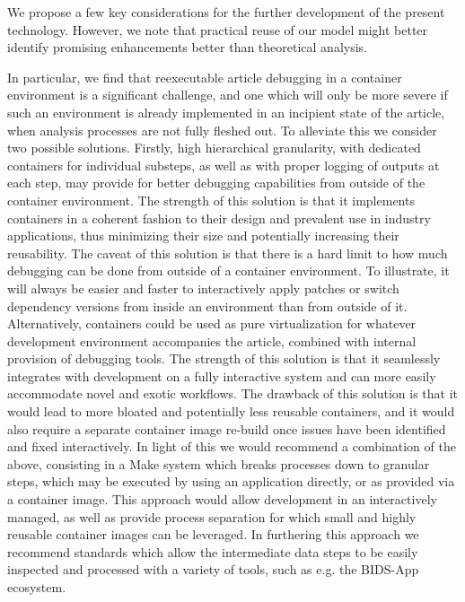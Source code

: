 We propose a few key considerations for the further development of the present technology.
However, we note that practical reuse of our model might better identify promising enhancements better than theoretical analysis.

In particular, we find that reexecutable article debugging in a container environment is a significant challenge, and one which will only be more severe if such an environment is already implemented in an incipient state of the article, when analysis processes are not fully fleshed out.
To alleviate this we consider two possible solutions.
Firstly, high hierarchical granularity, with dedicated containers for individual substeps, as well as with proper logging of outputs at each step, may provide for better debugging capabilities from outside of the container environment.
The strength of this solution is that it implements containers in a coherent fashion to their design and prevalent use in industry applications, thus minimizing their size and potentially increasing their reusability.
The caveat of this solution is that there is a hard limit to how much debugging can be done from outside of a container environment.
To illustrate, it will always be easier and faster to interactively apply patches or switch dependency versions from inside an environment than from outside of it.
Alternatively, containers could be used as pure virtualization for whatever development environment accompanies the article, combined with internal provision of debugging tools.
The strength of this solution is that it seamlessly integrates with development on a fully interactive system and can more easily accommodate novel and exotic workflows.
The drawback of this solution is that it would lead to more bloated and potentially less reusable containers, and it would also require a separate container image re-build once issues have been identified and fixed interactively.
In light of this we would recommend a combination of the above, consisting in a Make system which breaks processes down to granular steps, which may be executed by using an application directly, or as provided via a container image.
This approach would allow development in an interactively managed, as well as provide process separation for which small and highly reusable container images can be leveraged.
In furthering this approach we recommend standards which allow the intermediate data steps to be easily inspected and processed with a variety of tools, such as e.g. the BIDS-App ecosystem.


